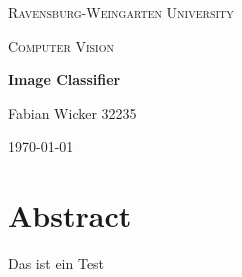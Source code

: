 \documentclass{scrartcl}
\begin{document}
	\begin{titlepage}
		\centering
		{\scshape\LARGE Ravensburg-Weingarten University\par}
		\vspace{1.5cm}
		\begin{figure}[hb]
			\centering
			\rwulogo[width=0.4\columnwidth]
		\end{figure}

		\vspace{5cm}
		{\scshape\Large Computer Vision\par}
		\vspace{0.25cm}
		{\huge\bfseries Image Classifier\par}
		\vspace{6cm}
		{\Large Fabian Wicker 32235\par}
		\vfill
		{\large \today\par}
	\end{titlepage}
	\clearpage
	\section{Abstract}
		Das ist ein Test
	\tableofcontents
	\clearpage
	\listoffigures
	\clearpage
	\listoftables
	\clearpage
	\clearpage
\end{document}
